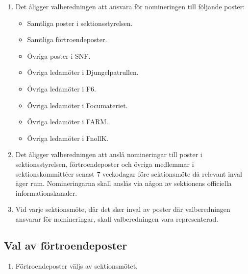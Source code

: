 \documentclass[11pt,a4paper]{article}
\begin{document}
\begin{enumerate}[\thesubsection .1]

  \item Det åligger valberedningen att ansvara för nomineringen till
  följande poster:
    \begin{itemize}
      \item Samtliga poster i sektionsstyrelsen.
      \item Samtliga förtroendeposter.
      \item Övriga poster i SNF.
      \item Övriga ledamöter i Djungelpatrullen.
      \item Övriga ledamöter i F6.
      \item Övriga ledamöter i Focumateriet.
        \item Övriga ledamöter i FARM.
          \item Övriga ledamöter i FnollK. 
        
    \end{itemize}
  \item Det åligger valberedningen att anslå nomineringar till poster i sektionsstyrelsen, förtroendeposter
och övriga medlemmar i sektionskommittéer senast 7 veckodagar före sektionsmöte då relevant inval
äger rum. Nomineringarna skall anslås via någon av sektionens officiella informationskanaler.

\item  Vid varje sektionsmöte, där det sker inval av poster där valberedningen ansvarar för nomineringar, skall valberedningen vara representerad.

\end{enumerate}

\subsection{Val av förtroendeposter}
	\begin{enumerate}[\thesubsection .1]
	\item Förtroendeposter väljs av sektionsmötet.
	\end{enumerate}
\end{document}
